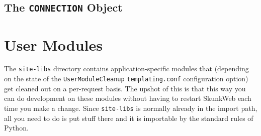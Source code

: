 \documentclass{manual}
\begin{document}
\section{The \texttt{CONNECTION} Object}
\label{connectionobj}

\chapter{User Modules}
\label{usermodules}
The \texttt{site-libs} directory contains application-specific modules
that (depending on the state of the \texttt{UserModuleCleanup}
\texttt{templating.conf} configuration option) get cleaned out on a
per-request basis.  The upshot of this is that this way you can do
development on these modules without having to restart SkunkWeb each time
you make a change.  Since \texttt{site-libs} is normally already in
the import path, all you need to do is put stuff there and it is
importable by the standard rules of Python.

\cleardoublepage

\printindex
\end{document}
